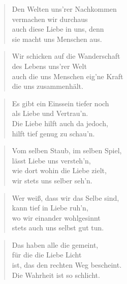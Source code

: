 \documentclass[10pt,a4paper]{article}
\begin{document}
\begin{paracol}{2}
\begin{verse}
Den Welten uns’rer Nachkommen \\
vermachen wir durchaus \\
auch diese Liebe in uns, denn \\
sie macht uns Menschen aus. \\
\end{verse}

\begin{verse}
Wir schicken auf die Wanderschaft \\
des Lebens uns’rer Welt \\
auch die uns Menschen eig’ne Kraft \\
die uns zusammenhält. \\
\end{verse}

\begin{verse}
Es gibt ein Einssein tiefer noch \\
als Liebe und Vertrau’n. \\
Die Liebe hilft auch da jedoch, \\
hilft tief genug zu schau’n. \\
\end{verse}

\begin{verse}
Vom selben Staub, im selben Spiel, \\
lässt Liebe uns versteh’n, \\
wie dort wohin die Liebe zielt, \\
wir stets uns selber seh’n. \\
\end{verse}

\begin{verse}
Wer weiß, dass wir das Selbe sind, \\
kann tief in Liebe ruh’n, \\
wo wir einander wohlgesinnt \\
stets auch uns selbst gut tun. \\
\end{verse}

\begin{verse}
Das haben alle die gemeint, \\
für die die Liebe Licht \\
ist, das den rechten Weg bescheint. \\
Die Wahrheit ist so schlicht. \\
\end{verse}


\end{paracol}
\end{document}
